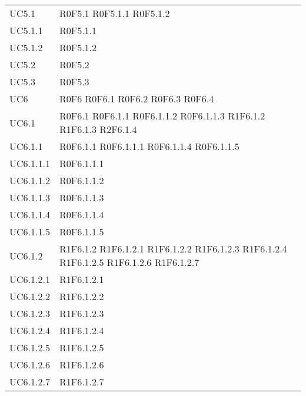 \begin{longtable}{p{2.5cm}!{\VRule[1pt]}p{5.5cm}}
UC5.1 & R0F5.1
	\newline R0F5.1.1
	\newline R0F5.1.2\\	
UC5.1.1 & R0F5.1.1\\
UC5.1.2 & R0F5.1.2\\
UC5.2 & R0F5.2\\
UC5.3 & R0F5.3\\
UC6 & R0F6
	\newline R0F6.1
	\newline R0F6.2
	\newline R0F6.3
	\newline R0F6.4\\
UC6.1 & R0F6.1
	\newline R0F6.1.1
	\newline R0F6.1.1.2
	\newline R0F6.1.1.3
	\newline R1F6.1.2
	\newline R1F6.1.3
	\newline R2F6.1.4\\
UC6.1.1 & R0F6.1.1
	\newline R0F6.1.1.1
	\newline R0F6.1.1.4
	\newline R0F6.1.1.5\\
UC6.1.1.1 & R0F6.1.1.1\\
UC6.1.1.2 & R0F6.1.1.2\\
UC6.1.1.3 & R0F6.1.1.3\\
UC6.1.1.4 & R0F6.1.1.4\\
UC6.1.1.5 & R0F6.1.1.5\\
UC6.1.2 & R1F6.1.2
	\newline R1F6.1.2.1
	\newline R1F6.1.2.2
	\newline R1F6.1.2.3
	\newline R1F6.1.2.4
	\newline R1F6.1.2.5
	\newline R1F6.1.2.6
	\newline R1F6.1.2.7\\
UC6.1.2.1 & R1F6.1.2.1\\
UC6.1.2.2 & R1F6.1.2.2\\
UC6.1.2.3 & R1F6.1.2.3\\
UC6.1.2.4 & R1F6.1.2.4\\
UC6.1.2.5 & R1F6.1.2.5\\
UC6.1.2.6 & R1F6.1.2.6\\
UC6.1.2.7 & R1F6.1.2.7\\

\end{longtable}
